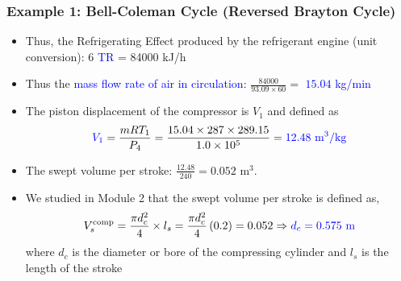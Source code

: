 \documentclass[10pt,compress]{beamer}
\newcommand{\frc}{\displaystyle\frac}
\begin{document}
\begin{frame}
 \frametitle{Example 1: Bell-Coleman Cycle (Reversed Brayton Cycle)}
  \begin{itemize}
   \item <1-> Thus, the Refrigerating Effect produced by the refrigerant engine (unit conversion): 6 \textcolor{blue}{TR} = 84000 kJ/h


   \item <2-> Thus the \textcolor{blue}{mass flow rate of air in circulation}: $\frc{84000}{93.09\times 60}=$ \textcolor{blue}{$15.04$ kg/min}

   \item <3-> The piston displacement of the compressor is $V_{1}$ and defined as
     \begin{displaymath}
      \textcolor{blue}{V_{1}} =  \frc{m R T_{1}}{P_{4}} = \frc{15.04 \times 287 \times 289.15}{1.0\times 10^{5}} = \textcolor{blue}{12.48 \text{ m}^{3}/\text{kg}}
     \end{displaymath}

   \item <4-> The swept volume per stroke: $\frc{12.48}{240}=0.052$ m$^{3}$.

   \item <5-> We studied in Module 2 that the swept volume per stroke is defined as,
     \begin{displaymath}
      V_{s}^{\text{comp}}= \frc{\pi d_{c}^{2}}{4}\times l_{s} = \frc{\pi d_{c}^{2}}{4}\left(0.2\right) = 0.052 \Rightarrow \textcolor{blue}{d_{c} = 0.575\text{ m}}
     \end{displaymath}
    where $d_{c}$ is the diameter or bore of the compressing cylinder and $l_{s}$ is the length of the stroke

  \end{itemize}

\end{frame}
\end{document}
